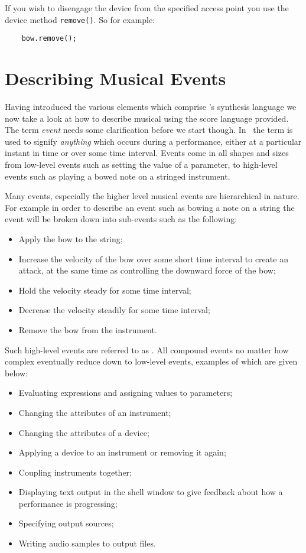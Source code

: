 If you wish to disengage the device from the specified access point you
use the device method \verb|remove()|. So for example:

\begin{verbatim}
    bow.remove();
\end{verbatim}

\section{Describing Musical Events}
Having introduced the various elements which comprise \tao's synthesis
language we now take a look at how to describe musical 
using the score language provided. The term
\emph{event} needs some clarification before we start though. In \tao\
the term is used to signify \emph{anything}
which occurs during a performance, either at a particular instant in time
or over some time interval. Events come in all shapes and sizes from
low-level events such as setting the value of a parameter, to high-level
events such as playing a bowed note on a stringed instrument. 

Many events, especially the higher level musical events are hierarchical
in nature. For example in order to describe an event such as bowing a
note on a string the event will be broken down into sub-events such as
the following:

\begin{itemize}
\item
Apply the bow to the string;
\item
Increase the velocity of the bow over some short time interval to
create an attack, at the same time as controlling the downward
force of the bow;
\item
Hold the velocity steady for some time interval;
\item
Decrease the velocity steadily for some time interval;
\item
Remove the bow from the instrument.
\end{itemize}

Such high-level events are referred to as .
All compound events no matter how complex eventually reduce down to
low-level events, examples of which are given below:

\begin{itemize}
\item
Evaluating expressions and assigning values to parameters;
\item
Changing the attributes of an instrument;
\item
Changing the attributes of a device;
\item
Applying a device to an instrument or removing it again;
\item
Coupling instruments together;
\item
Displaying text output in the shell window to give feedback about how
a performance is progressing;
\item
Specifying output sources;
\item
Writing audio samples to output files.
\end{itemize}

